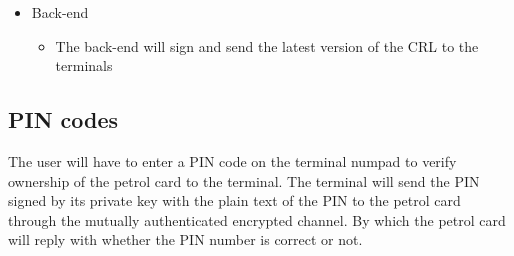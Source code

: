 \begin{itemize}




\item Back-end
\begin{itemize}
\item The back-end will sign and send the latest version of the CRL to the terminals
\end{itemize}
\end{itemize}

\subsection{PIN codes}
The user will have to enter a PIN code on the terminal numpad to verify ownership of the petrol card to the terminal. The terminal will send the PIN signed by its private key with the plain text of the PIN to the petrol card through the mutually authenticated encrypted channel. By which the petrol card will reply with whether the PIN number is correct or not.

